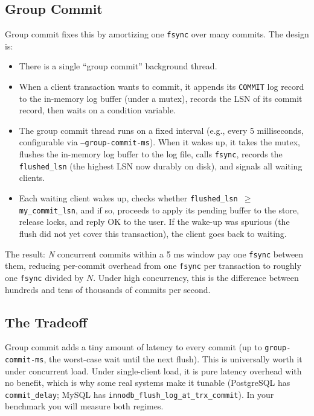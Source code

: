 \documentclass[11pt,a4paper]{article}
\begin{document}
\subsection{Group Commit}
Group commit fixes this by amortizing one \texttt{fsync} over many commits. The design is:

\begin{itemize}
\item There is a single ``group commit'' background thread.
\item When a client transaction wants to commit, it appends its \texttt{COMMIT} log record to the in-memory log buffer (under a mutex), records the LSN of its commit record, then waits on a condition variable.
\item The group commit thread runs on a fixed interval (e.g., every 5 milliseconds, configurable via \texttt{--group-commit-ms}). When it wakes up, it takes the mutex, flushes the in-memory log buffer to the log file, calls \texttt{fsync}, records the \texttt{flushed\_lsn} (the highest LSN now durably on disk), and signals all waiting clients.
\item Each waiting client wakes up, checks whether \texttt{flushed\_lsn $\geq$ my\_commit\_lsn}, and if so, proceeds to apply its pending buffer to the store, release locks, and reply OK to the user. If the wake-up was spurious (the flush did not yet cover this transaction), the client goes back to waiting.
\end{itemize}

The result: \textit{N} concurrent commits within a 5 ms window pay one \texttt{fsync} between them, reducing per-commit overhead from one \texttt{fsync} per transaction to roughly one \texttt{fsync} divided by $N$. Under high concurrency, this is the difference between hundreds and tens of thousands of commits per second.

\subsection{The Tradeoff}
Group commit adds a tiny amount of latency to every commit (up to \texttt{group-commit-ms}, the worst-case wait until the next flush). This is universally worth it under concurrent load. Under single-client load, it is pure latency overhead with no benefit, which is why some real systems make it tunable (PostgreSQL has \texttt{commit\_delay}; MySQL has \texttt{innodb\_flush\_log\_at\_trx\_commit}). In your benchmark you will measure both regimes.
\end{document}
